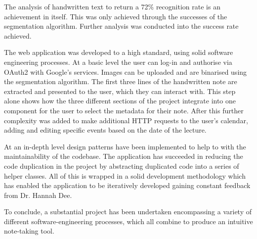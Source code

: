 The analysis of handwritten text to return a 72\% recognition rate is an achievement in itself. This was only achieved through the successes of the segmentation algorithm. Further analysis was conducted into the success rate achieved.

The web application was developed to a high standard, using solid software engineering processes. At a basic level the user can log-in and authorise via OAuth2 with Google's services. Images can be uploaded and  are binarised using the segmentation algorithm. The first three lines of the handwritten note are extracted and presented to the user, which they can interact with. This step alone shows how the three different sections of the project integrate into one component for the user to select the metadata for their note. After this further complexity was added to make additional HTTP requests to the user's calendar, adding and editing specific events based on the date of the lecture.

At an in-depth level design patterns have been implemented to help to with the maintainability of the codebase. The application has succeeded in reducing the code duplication in the project by abstracting duplicated code into a series of helper classes. All of this is wrapped in a solid development methodology which has enabled the application to be iteratively developed gaining constant feedback from Dr. Hannah Dee.

To conclude, a substantial project has been undertaken encompassing a variety of different software-engineering processes, which all combine to produce an intuitive note-taking tool.

